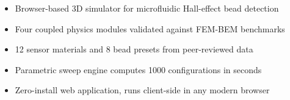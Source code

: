 \begin{itemize}
\item Browser-based 3D simulator for microfluidic Hall-effect bead detection
\item Four coupled physics modules validated against FEM-BEM benchmarks
\item 12 sensor materials and 8 bead presets from peer-reviewed data
\item Parametric sweep engine computes 1000 configurations in seconds
\item Zero-install web application, runs client-side in any modern browser
\end{itemize}

